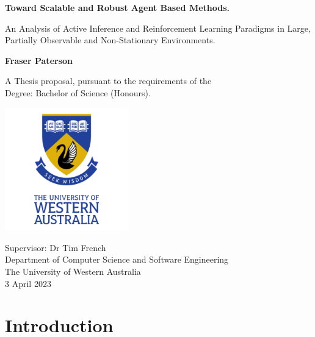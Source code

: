\documentclass[12pt, oneside]{article}
\begin{document}
\begin{titlepage}
	\begin{center}
	
	\vspace*{0.5cm}
	
	\Huge
	\textbf{Toward Scalable and Robust Agent Based Methods.}
	
	\vspace{0.5cm}
	\Large
	An Analysis of Active Inference and Reinforcement Learning Paradigms in Large, Partially Observable and Non-Stationary Environments.
	
	\vspace{1.5cm}

	\textbf{Fraser Paterson}

	\vspace{1.5cm}

	A Thesis proposal, pursuant to the requirements of the\\ 
	Degree: Bachelor of Science (Honours).  
	
	\vspace{2.0cm}

	\includegraphics[width=0.4\textwidth]{UWA_Logo.png}
	
	\vspace{2.0cm}	
	
	\Large
	Supervisor: Dr Tim French\\ 
	Department of Computer Science and Software Engineering\\
	The University of Western Australia\\
	3 April 2023
	
	\end{center}
\end{titlepage}


\tableofcontents

\cleardoublepage



\section{Introduction}
\end{document}
